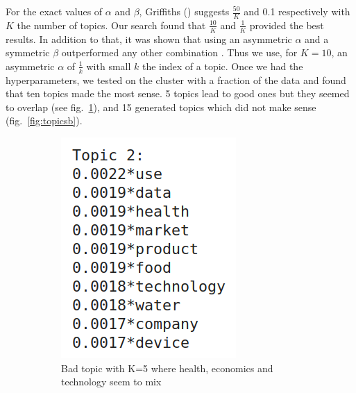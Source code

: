 \documentclass[11pt]{article}
\begin{document}
For the exact values of $\alpha$ and $\beta$, Griffiths (\citeyear{Gri:04}) suggests $\frac{50}{K}$ and 0.1 respectively with $K$ the number of topics. Our search found that $\frac{10}{K}$ and $\frac{1}{K}$ provided the best results. In addition to that, it was shown that using an asymmetric $\alpha$ and a symmetric $\beta$ outperformed any other combination \autocite{Wal:09}. Thus we use, for $K=10$, an asymmetric $\alpha$ of $\frac{1}{k}$ with small $k$ the index of a topic. Once we had the hyperparameters, we tested on the cluster with a fraction of the data and found that ten topics made the most sense. 5 topics lead to good ones but they seemed to overlap (see fig.~\ref{fig:topicsa}), and 15 generated topics which did not make sense (fig.~\ref{fig:topicsb}). 

\begin{figure}[htpb!]
  \begin{subfigure}[t]{.45\linewidth}
    \centering
    \includegraphics[height=1\linewidth]{images/K=5.png}
    \caption{Bad topic with K=5 where health, economics and technology seem to mix}
    \label{fig:topicsa}
  \end{subfigure}
  \hfill
  \begin{subfigure}[t]{.45\linewidth}
    \centering

\end{subfigure}
\end{figure}
\end{document}
